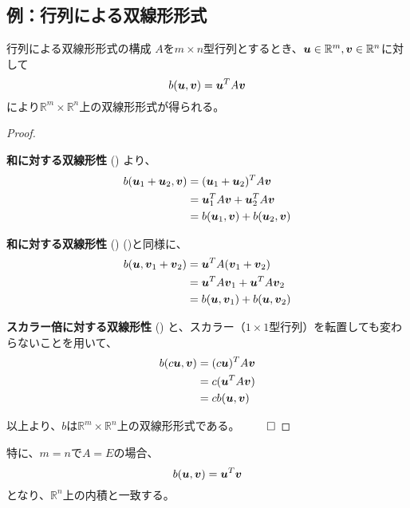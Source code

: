 \documentclass[../../../topic_linear-algebra]{subfiles}
\begin{document}
\subsection{例：行列による双線形形式}

\begin{theorem*}{行列による双線形形式の構成}
  $A$を$m \times n$型行列とするとき、$\vb*{u} \in \mathbb{R}^m, \vb*{v} \in \mathbb{R}^n$に対して
  \begin{equation*}
    b(\vb*{u}, \vb*{v}) = \vb*{u}^T A \vb*{v}
  \end{equation*}
  により$\mathbb{R}^m \times \mathbb{R}^n$上の双線形形式が得られる。
\end{theorem*}

\begin{proof}
  \begin{subpattern}{{\bfseries 和に対する双線形性} ()}
    より、
    \begin{align*}
      b(\vb*{u}_1 + \vb*{u}_2, \vb*{v}) &= (\vb*{u}_1 + \vb*{u}_2)^T A \vb*{v} \\
      &= \vb*{u}_1^T A \vb*{v} + \vb*{u}_2^T A \vb*{v} \\
      &= b(\vb*{u}_1, \vb*{v}) + b(\vb*{u}_2, \vb*{v})
    \end{align*}
  \end{subpattern}
  
  \begin{subpattern}{{\bfseries 和に対する双線形性} ()}
    ()と同様に、
    \begin{align*}
      b(\vb*{u}, \vb*{v}_1 + \vb*{v}_2) &= \vb*{u}^T A (\vb*{v}_1 + \vb*{v}_2) \\
      &= \vb*{u}^T A \vb*{v}_1 + \vb*{u}^T A \vb*{v}_2 \\
      &= b(\vb*{u}, \vb*{v}_1) + b(\vb*{u}, \vb*{v}_2)
    \end{align*}
  \end{subpattern}
  
  \begin{subpattern}{{\bfseries スカラー倍に対する双線形性} ()}
    と、スカラー（$1 \times 1$型行列）を転置しても変わらないことを用いて、
    \begin{align*}
      b(c\vb*{u}, \vb*{v}) &= (c\vb*{u})^T A \vb*{v} \\
      &= c(\vb*{u}^T A \vb*{v}) \\
      &= cb(\vb*{u}, \vb*{v})
    \end{align*}
  \end{subpattern}
  
  以上より、$b$は$\mathbb{R}^m \times \mathbb{R}^n$上の双線形形式である。 $\qed$
\end{proof}

\br

特に、$m =n$で$A = E$の場合、
\begin{equation*}
  b(\vb*{u}, \vb*{v}) = \vb*{u}^T \vb*{v}
\end{equation*}
となり、$\mathbb{R}^n$上の内積と一致する。
\end{document}
